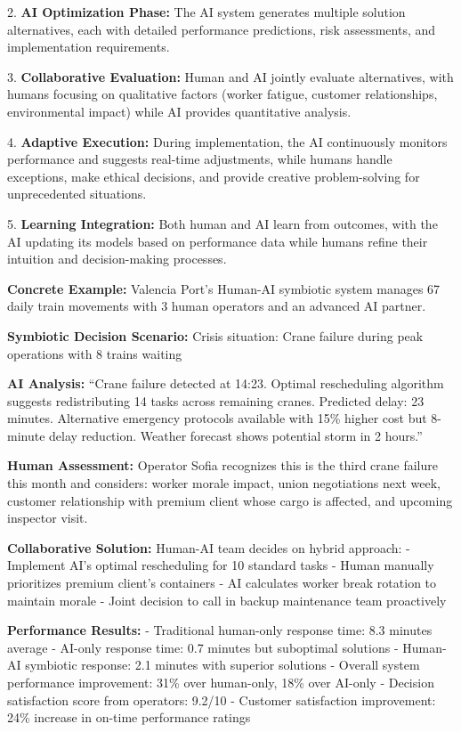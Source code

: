 \documentclass{article}
\begin{document}
2. \textbf{AI Optimization Phase:} The AI system generates multiple solution alternatives, each with detailed performance predictions, risk assessments, and implementation requirements.

3. \textbf{Collaborative Evaluation:} Human and AI jointly evaluate alternatives, with humans focusing on qualitative factors (worker fatigue, customer relationships, environmental impact) while AI provides quantitative analysis.

4. \textbf{Adaptive Execution:} During implementation, the AI continuously monitors performance and suggests real-time adjustments, while humans handle exceptions, make ethical decisions, and provide creative problem-solving for unprecedented situations.

5. \textbf{Learning Integration:} Both human and AI learn from outcomes, with the AI updating its models based on performance data while humans refine their intuition and decision-making processes.

\textbf{Concrete Example:}
Valencia Port's Human-AI symbiotic system manages 67 daily train movements with 3 human operators and an advanced AI partner.

\textbf{Symbiotic Decision Scenario:}
Crisis situation: Crane failure during peak operations with 8 trains waiting

\textbf{AI Analysis:} ``Crane failure detected at 14:23. Optimal rescheduling algorithm suggests redistributing 14 tasks across remaining cranes. Predicted delay: 23 minutes. Alternative emergency protocols available with 15\% higher cost but 8-minute delay reduction. Weather forecast shows potential storm in 2 hours.''

\textbf{Human Assessment:} Operator Sofia recognizes this is the third crane failure this month and considers: worker morale impact, union negotiations next week, customer relationship with premium client whose cargo is affected, and upcoming inspector visit.

\textbf{Collaborative Solution:} Human-AI team decides on hybrid approach:
- Implement AI's optimal rescheduling for 10 standard tasks
- Human manually prioritizes premium client's containers
- AI calculates worker break rotation to maintain morale
- Joint decision to call in backup maintenance team proactively

\textbf{Performance Results:}
- Traditional human-only response time: 8.3 minutes average
- AI-only response time: 0.7 minutes but suboptimal solutions
- Human-AI symbiotic response: 2.1 minutes with superior solutions
- Overall system performance improvement: 31\% over human-only, 18\% over AI-only
- Decision satisfaction score from operators: 9.2/10
- Customer satisfaction improvement: 24\% increase in on-time performance ratings
\end{document}

